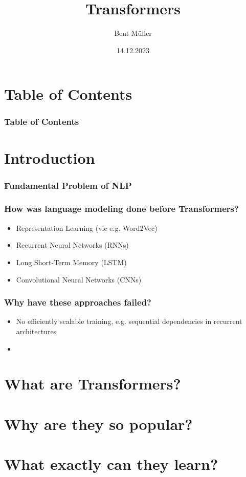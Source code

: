 \documentclass[serif]{beamer}
\title{Transformers}
\author{Bent Müller}
\institute{University of Hamburg, Department of Mathematics}
\date{14.12.2023}
\begin{document}
\section{Table of Contents}

\begin{frame}
    \frametitle{Table of Contents}
    \tableofcontents
\end{frame}


\section{Introduction}

\begin{frame}
    \frametitle{Fundamental Problem of NLP}
    
\end{frame}

\begin{frame}
    \frametitle{How was language modeling done before Transformers?}
    \begin{itemize}
        \item Representation Learning (vie e.g. Word2Vec)
        \item Recurrent Neural Networks (RNNs)
        \item Long Short-Term Memory (LSTM)
        \item Convolutional Neural Networks (CNNs)
    \end{itemize}
\end{frame}

\begin{frame}
    \frametitle{Why have these approaches failed?}
    \begin{itemize}
        \item No efficiently scalable training, e.g. sequential dependencies in recurrent architectures
        \item 
    \end{itemize}
\end{frame}

\section{What are Transformers?}
\section{Why are they so popular?}
\section{What exactly can they learn?}
\end{document}

